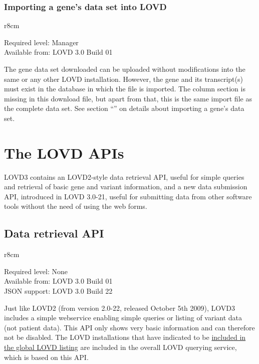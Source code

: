 \hypertarget{ssec:import_gene_data}{}
\subsection{Importing a gene's data set into LOVD}
\begin{wrapfigure}[3]{r}{8cm} %
  \vspace{-25pt}
  \begin{leftbar}
    Required level: Manager\\
    Available from: LOVD 3.0 Build 01
  \end{leftbar}
\end{wrapfigure}
The gene data set downloaded can be uploaded without modifications into the same or any other LOVD installation.
However, the gene and its transcript(s) must exist in the database in which the file is imported.
The column section is missing in this download file, but apart from that, this is the same import file as the
 complete data set.
See section ``'' on details about importing a gene's data set.










\chapter{The LOVD APIs}
\label{chap:api}
LOVD3 contains an LOVD2-style data retrieval API, useful for simple queries and retrieval of basic
 gene and variant information, and a new data submission API, introduced in LOVD 3.0-21, useful for submitting data
 from other software tools without the need of using the web forms.





\section{Data retrieval API}
\begin{wrapfigure}[4]{r}{8cm}
  \vspace{-25pt}
  \begin{leftbar}
    Required level: None\\
    Available from: LOVD 3.0 Build 01\\
    JSON support: LOVD 3.0 Build 22
  \end{leftbar}
\end{wrapfigure}
Just like LOVD2 (from version 2.0-22, released October 5th 2009), LOVD3 includes a simple
 webservice enabling simple queries or listing of variant data (not patient data).
This API only shows very basic information and can therefore not be disabled.
The LOVD installations that have indicated to be \hyperlink{item:include_in_listing}{included in the
 global LOVD listing} are included in the overall LOVD querying service, which is based on this API.

